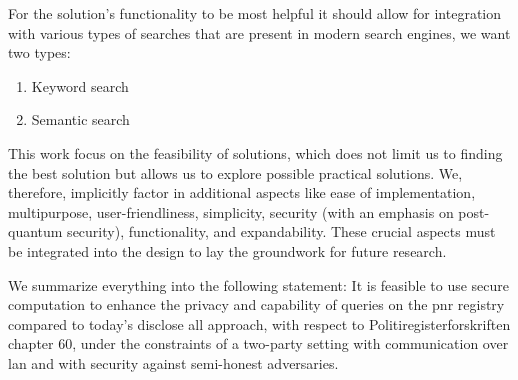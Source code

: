 For the solution's functionality to be most helpful it should allow for integration with various types of searches that are present in modern search engines, we want two types:

\begin{enumerate}
    \item Keyword search
    \item Semantic search
\end{enumerate}

This work focus on the feasibility of solutions, which does not limit us to finding the best solution but allows us to explore possible practical solutions. We, therefore, implicitly factor in additional aspects like ease of implementation, multipurpose, user-friendliness, simplicity, security (with an emphasis on post-quantum security), functionality, and expandability. These crucial aspects must be integrated into the design to lay the groundwork for future research.

We summarize everything into the following statement: It is feasible to use secure computation to enhance the privacy and capability of queries on the \acrshort{pnr} registry compared to today's disclose all approach, with respect to Politiregisterforskriften chapter 60, under the constraints of a two-party setting with communication over \acrfull{lan} and with security against semi-honest adversaries.
